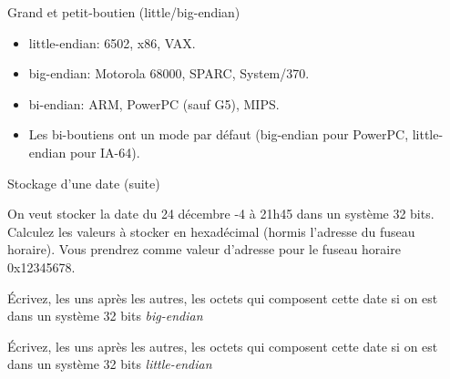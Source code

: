 \begin{frame}{Grand et petit-boutien (little/big-endian)}
\begin{itemize}
\begin{itemize}
    \end{itemize}
  \item<3-> little-endian: 6502, x86, VAX.
  \item<4-> big-endian: Motorola 68000, SPARC, System/370.
  \item<5-> bi-endian: ARM, PowerPC (sauf G5), MIPS.
  \item<5-> Les bi-boutiens ont un mode par défaut (big-endian pour PowerPC,
    little-endian pour IA-64).
  \end{itemize}
\end{frame}
\begin{exercice}
  \begin{exercicelet}{Stockage d'une date (suite)}
    \begin{questions}
    \item On veut stocker la date du 24 décembre -4 à 21h45 dans un système 32
      bits. Calculez les valeurs à stocker en hexadécimal (hormis l'adresse du
      fuseau horaire). Vous prendrez comme valeur d'adresse pour le fuseau
      horaire 0x12345678.
    \item Écrivez, les uns après les autres, les octets qui composent cette
      date si on est dans un système 32 bits \emph{big-endian}
    \item Écrivez, les uns après les autres, les octets qui composent cette
      date si on est dans un système 32 bits \emph{little-endian}
    \end{questions}
  \end{exercicelet}
\end{exercice}
